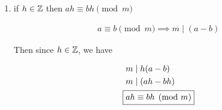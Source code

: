 \documentclass[../../Main.tex]{subfiles}
\begin{document}
\begin{proposition}
\begin{enumerate}
{\begin{poof}
                Then $a = b + mk_1$ and $c = d + mk_2$

                \begin{align*}
                    ac &= (b + mk_1) + (d + mk_2) \tag{FOIL} \\
                    &= bd + bmk_2 + dmk_1 + m^2 k_1k_2 \\ 
                \end{align*}

                Moving $bd$

                \begin{align*}
                    ac - bd &= bmk_2 + dmk_1 + m^2 k_1k_2 \\
                    &= m(bk_2 + dk_1 + mk_1k_2) \\
                    \Aboxed{& \therefore m \mid (ac - bd)}
                \end{align*}
            \end{poof}
        }

        \item
        {
            if $h \in \mathbb{Z}$ then $ah \equiv bh \pmod{m}$

            \begin{poof}
                \begin{align*}
                    a \equiv b \pmod{m} \implies m \mid (a - b)
                \end{align*}

                Then since $h \in \mathbb{Z}$, we have

                \begin{align*}
                    & m \mid h(a - b) \\
                    & m \mid (ah - bh) \\
                    \Aboxed{& ah \equiv bh \pmod{m}} \\
                \end{align*}
            \end{poof}
        }
    \end{enumerate}
\end{proposition}

\end{document}

